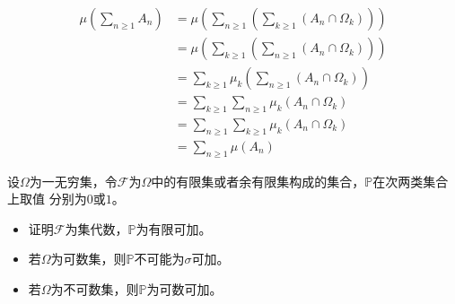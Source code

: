 \documentclass{ctexart}
\begin{document}
\begin{solution}
\begin{itemize}
      \[
        \begin{aligned}
          \mu(\sum_{n \geq 1} A_n) &= \mu(\sum_{n \geq 1} (\sum_{k \geq 1} (A_n \cap \Omega_k)))\\ 
          &= \mu(\sum_{k \geq 1} (\sum_{n \geq 1} (A_n \cap \Omega_k)))\\ 
          &= \sum_{k \geq 1}\mu_k(\sum_{n \geq 1}(A_n \cap \Omega_k))\\ 
          &= \sum_{k \geq 1}\sum_{n \geq 1} \mu_k(A_n \cap \Omega_k)\\ 
          &=\sum_{n \geq 1}\sum_{k \geq 1}\mu_k(A_n \cap \Omega_k)\\ 
          &=\sum_{n \geq 1}\mu(A_n)
        \end{aligned}
      \]
  \end{itemize}
\end{solution}

\begin{problem} 
  设\(\Omega \)为一无穷集，令\(\mathcal{F} \)为\(\Omega \)中的有限集或者余有限集构成的集合，\(\mathbb{P} \)在次两类集合上取值
  分别为\(0 \)或\(1 \)。
  \begin{itemize}
    \item 证明\(\mathcal{F} \)为集代数，\(\mathbb{P} \)为有限可加。
    \item 若\(\Omega \)为可数集，则\(\mathbb{P} \)不可能为\(\sigma \)可加。
    \item 若\(\Omega \)为不可数集，则\(\mathbb{P} \)为可数可加。
  \end{itemize}
\end{problem}
\begin{solution}
  
\end{solution}
\end{document}

